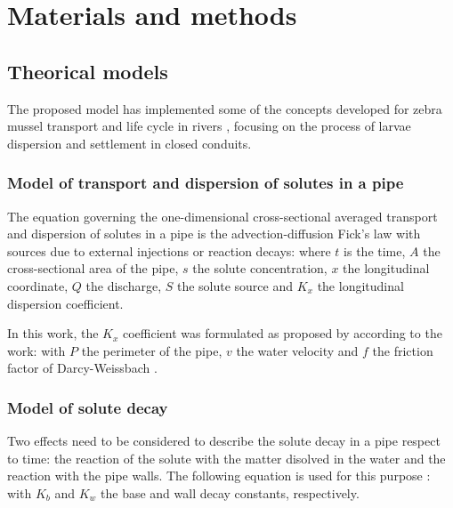 \documentclass[review,authoryear]{elsarticle}
\begin{document}
\section{Materials and methods}

\subsection{Theorical models}

The proposed model has implemented some of the concepts developed for zebra
mussel transport and life cycle in rivers \citep{Wu10,Huang17,JinZhao21},
focusing on the process of larvae dispersion and settlement in closed conduits.

\subsubsection{Model of transport and dispersion of solutes in a pipe}

The equation governing the one-dimensional cross-sectional averaged transport
and dispersion of solutes in a pipe is the advection-diffusion Fick's law with
sources due to external injections or reaction decays:
where $t$ is the time, $A$ the cross-sectional area of the pipe, $s$ the solute
concentration, $x$ the longitudinal coordinate, $Q$ the discharge, $S$ the
solute source and $K_x$ the longitudinal dispersion coefficient.

In this work,  the $K_x$ coefficient was formulated as proposed by
\citet{JaviTrans} according to the \citet{Rutherford94} work: 
with $P$ the perimeter of the pipe, $v$ the water velocity and $f$ the friction
factor of Darcy-Weissbach \citep{Darcy58}.

\subsubsection{Model of solute decay}

Two effects need to be considered to describe the solute decay in a pipe respect
to time: the reaction of the solute with the matter disolved in the water and
the reaction with the pipe walls. The following equation is used for this
purpose \citep{DiGianoZhang05}:
with $K_b$ and $K_w$ the base and wall decay constants, respectively. 
\end{document}
